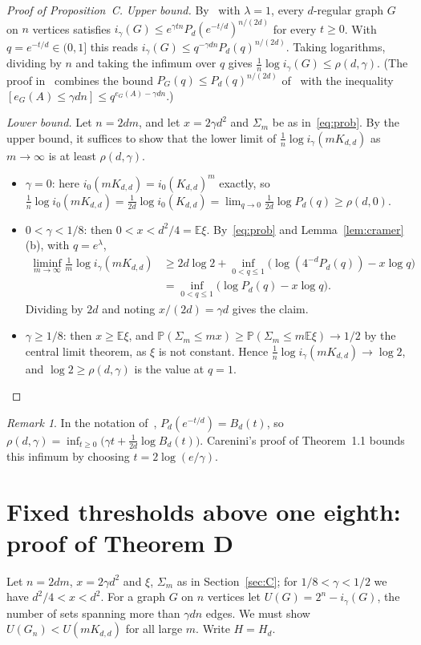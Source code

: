 \documentclass[11pt]{article}
\theoremstyle{remark}
\newtheorem{remark}[theorem]{Remark}
\newcommand{\Prb}{\mathbb P}
\newcommand{\Ex}{\mathbb E}
\begin{document}
\begin{proof}[Proof of Proposition~C]
\emph{Upper bound.} By~\cite[Proposition~2.1]{car} with $\lambda=1$, every
$d$-regular graph $G$ on $n$ vertices satisfies
$i_\gamma(G)\le e^{\gamma tn}P_d(e^{-t/d})^{n/(2d)}$ for every $t\ge0$. With
$q=e^{-t/d}\in(0,1]$ this reads $i_\gamma(G)\le q^{-\gamma dn}P_d(q)^{n/(2d)}$.
Taking logarithms, dividing by $n$ and taking the infimum over $q$ gives
$\frac1n\log i_\gamma(G)\le\rho(d,\gamma)$. (The proof in~\cite{car} combines
the bound $P_G(q)\le P_d(q)^{n/(2d)}$ of~\cite[Corollary~1.15]{sssz} with the
inequality $[e_G(A)\le\gamma dn]\le q^{e_G(A)-\gamma dn}$.)

\emph{Lower bound.} Let $n=2dm$, and let $x=2\gamma d^2$ and $\Sigma_m$ be as
in~\eqref{eq:prob}. By the upper bound, it suffices to show that the lower
limit of $\frac1n\log i_\gamma(mK_{d,d})$ as $m\to\infty$ is at least
$\rho(d,\gamma)$.
\begin{itemize}
\item $\gamma=0$: here $i_0(mK_{d,d})=i_0(K_{d,d})^m$ exactly, so
 $\frac1n\log i_0(mK_{d,d})=\frac1{2d}\log i_0(K_{d,d})=
 \lim_{q\to0}\frac1{2d}\log P_d(q)\ge\rho(d,0)$.
\item $0<\gamma<1/8$: then $0<x<d^2/4=\Ex\xi$. By~\eqref{eq:prob} and
 Lemma~\ref{lem:cramer}(b), with $q=e^\lambda$,
 \begin{align*}
 \liminf_{m\to\infty}\frac1m\log i_\gamma(mK_{d,d})
 &\ge2d\log2+\inf_{0<q\le1}\bigl(\log(4^{-d}P_d(q))-x\log q\bigr)\\
 &=\inf_{0<q\le1}\bigl(\log P_d(q)-x\log q\bigr).
 \end{align*}
 Dividing by $2d$ and noting $x/(2d)=\gamma d$ gives the claim.
\item $\gamma\ge1/8$: then $x\ge\Ex\xi$, and
 $\Prb(\Sigma_m\le mx)\ge\Prb(\Sigma_m\le m\Ex\xi)\to1/2$ by the central limit theorem,
 as $\xi$ is not constant. Hence $\frac1n\log i_\gamma(mK_{d,d})\to\log2$, and
 $\log2\ge\rho(d,\gamma)$ is the value at $q=1$.\qedhere
\end{itemize}
\end{proof}

\begin{remark}\label{rem:rho}
In the notation of~\cite{car}, $P_d(e^{-t/d})=B_d(t)$, so
$\rho(d,\gamma)=\inf_{t\ge0}\bigl(\gamma t+\frac1{2d}\log B_d(t)\bigr)$.
Carenini's proof of Theorem~1.1 bounds this infimum by choosing
$t=2\log(e/\gamma)$.
\end{remark}

\section{Fixed thresholds above one eighth: proof of Theorem D}\label{sec:D}
Let $n=2dm$, $x=2\gamma d^2$ and $\xi$, $\Sigma_m$ as in Section~\ref{sec:C}; for
$1/8<\gamma<1/2$ we have $d^2/4<x<d^2$. For a graph $G$ on $n$ vertices let
$U(G)=2^n-i_\gamma(G)$, the number of sets spanning more than $\gamma dn$
edges. We must show $U(G_n)<U(mK_{d,d})$ for all large $m$. Write $H=H_d$.
\end{document}
